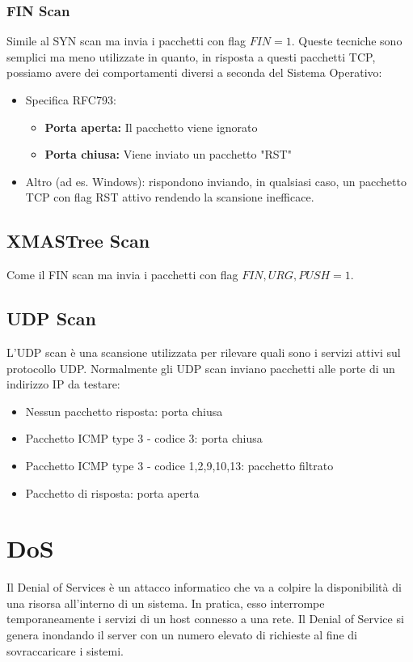 \subsubsection{FIN Scan}
Simile al SYN scan ma invia i pacchetti con flag $FIN=1$. Queste tecniche sono semplici ma meno utilizzate in quanto, in risposta a questi pacchetti TCP, possiamo avere dei comportamenti diversi a seconda del Sistema Operativo:
\begin{itemize}
    \item Specifica RFC793: 
    \begin{itemize}
        \item \textbf{Porta aperta:} Il pacchetto viene ignorato
        \item \textbf{Porta chiusa:} Viene inviato un pacchetto "RST"
    \end{itemize}
    \item Altro (ad es. Windows): rispondono inviando, in qualsiasi caso, un pacchetto TCP con flag RST attivo rendendo la scansione inefficace.
\end{itemize}

\subsection{XMASTree Scan}
Come il FIN scan ma invia i pacchetti con flag $FIN,URG,PUSH=1$. 

\subsection{UDP Scan}
L'UDP scan è una scansione utilizzata per rilevare quali sono i servizi attivi sul protocollo UDP. Normalmente gli UDP scan inviano pacchetti alle porte di un indirizzo IP da testare:
\begin{itemize}
    \item Nessun pacchetto risposta: porta chiusa
    \item Pacchetto ICMP type 3 - codice 3: porta chiusa
    \item Pacchetto ICMP type 3 - codice 1,2,9,10,13: pacchetto filtrato 
    \item Pacchetto di risposta: porta aperta 
\end{itemize}

\section{DoS}
Il Denial of Services è un attacco informatico che va a colpire la disponibilità di una risorsa all'interno di un sistema. In pratica, esso interrompe temporaneamente i servizi di un host connesso a una rete. Il Denial of Service si genera inondando il server con un numero elevato di richieste al fine di sovraccaricare i sistemi.


